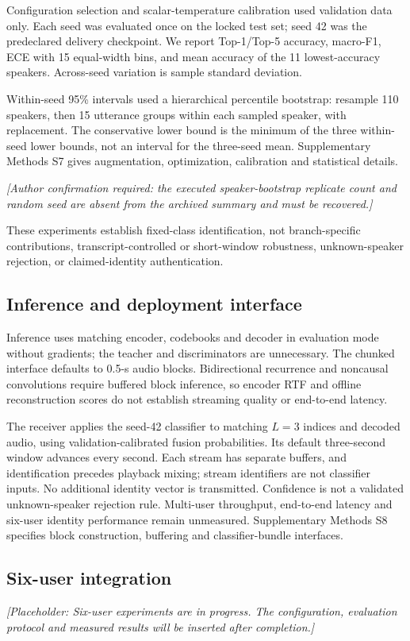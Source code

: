 \documentclass[final,5p,times,twocolumn]{elsarticle}
\begin{document}
Configuration selection and scalar-temperature calibration used validation data only. Each seed was evaluated once on the locked test set; seed 42 was the predeclared delivery checkpoint. We report Top-1/Top-5 accuracy, macro-F1, ECE with 15 equal-width bins, and mean accuracy of the 11 lowest-accuracy speakers. Across-seed variation is sample standard deviation.

Within-seed 95\% intervals used a hierarchical percentile bootstrap: resample 110 speakers, then 15 utterance groups within each sampled speaker, with replacement. The conservative lower bound is the minimum of the three within-seed lower bounds, not an interval for the three-seed mean. Supplementary Methods S7 gives augmentation, optimization, calibration and statistical details.

\noindent\textit{[Author confirmation required: the executed speaker-bootstrap replicate count and random seed are absent from the archived summary and must be recovered.]}

These experiments establish fixed-class identification, not branch-specific contributions, transcript-controlled or short-window robustness, unknown-speaker rejection, or claimed-identity authentication.

\subsection{Inference and deployment interface}
Inference uses matching encoder, codebooks and decoder in evaluation mode without gradients; the teacher and discriminators are unnecessary. The chunked interface defaults to 0.5-s audio blocks. Bidirectional recurrence and noncausal convolutions require buffered block inference, so encoder RTF and offline reconstruction scores do not establish streaming quality or end-to-end latency.

The receiver applies the seed-42 classifier to matching $L=3$ indices and decoded audio, using validation-calibrated fusion probabilities. Its default three-second window advances every second. Each stream has separate buffers, and identification precedes playback mixing; stream identifiers are not classifier inputs. No additional identity vector is transmitted. Confidence is not a validated unknown-speaker rejection rule. Multi-user throughput, end-to-end latency and six-user identity performance remain unmeasured. Supplementary Methods S8 specifies block construction, buffering and classifier-bundle interfaces.

\subsection{Six-user integration}
\noindent\textit{[Placeholder: Six-user experiments are in progress. The configuration, evaluation protocol and measured results will be inserted after completion.]}
\end{document}
